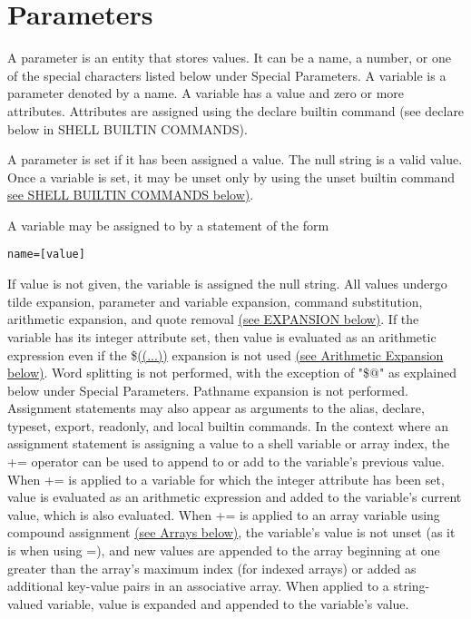 \section{Parameters}\label{sec:parameters}
A parameter is an entity that stores values. It can be a name, a number, or one of the special characters listed below under Special Parameters. A variable is a parameter denoted by a name. A variable has a value and zero or more attributes. Attributes are assigned using the declare builtin command (see declare below in SHELL BUILTIN COMMANDS).

A parameter is set if it has been assigned a value. The null string is a valid value. Once a variable is set, it may be unset only by using the unset builtin command \hyperref[sec:shellbuiltincommands]{see SHELL BUILTIN COMMANDS below)}.

A variable may be assigned to by a statement of the form

\begin{lstlisting}
name=[value]
\end{lstlisting}

If value is not given, the variable is assigned the null string. All values undergo tilde expansion, parameter and variable expansion, command substitution, arithmetic expansion, and quote removal \hyperref[sec:expansion]{(see EXPANSION below)}. If the variable has its integer attribute set, then value is evaluated as an arithmetic expression even if the \$\url{((...))} %
expansion is not used \hyperref[sec:arithmeticexpansion]{(see Arithmetic Expansion below)}. Word splitting is not performed, with the exception of "\$@" as explained below under Special Parameters. Pathname expansion is not performed. Assignment statements may also appear as arguments to the alias, declare, typeset, export, readonly, and local builtin commands.
In the context where an assignment statement is assigning a value to a shell variable or array index, the += operator can be used to append to or add to the variable's previous value. When += is applied to a variable for which the integer attribute has been set, value is evaluated as an arithmetic expression and added to the variable's current value, which is also evaluated. When += is applied to an array variable using compound assignment \hyperref[sec:arrays]{(see Arrays below)}, the variable's value is not unset (as it is when using =), and new values are appended to the array beginning at one greater than the array's maximum index (for indexed arrays) or added as additional key-value pairs in an associative array. When applied to a string-valued variable, value is expanded and appended to the variable's value.

